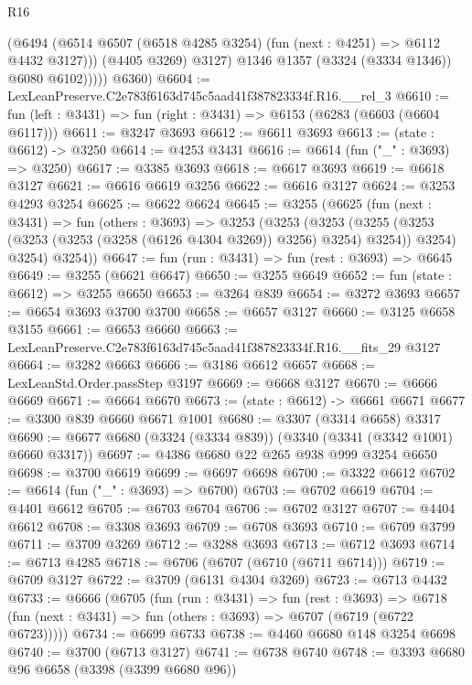 \begin{lexlean}{R16}
\begin{coremodule}
                  (@6494
                    (@6514 @6507 (@6518 @4285 @3254) (fun (next : @4251) => @6112 @4432 @3127)))
                  (@4405 @3269)
                  @3127)
                @1346
                @1357
                (@3324 (@3334 @1346))
                @6080
                @6102)))))
      @6360)
@6604 := LexLeanPreserve.C2e783f6163d745c5aad41f387823334f.R16.__rel_3
@6610 := fun (left : @3431) => fun (right : @3431) => @6153 (@6283 (@6603 (@6604 @6117)))
@6611 := @3247 @3693
@6612 := @6611 @3693
@6613 := (state : @6612) -> @3250
@6614 := @4253 @3431
@6616 := @6614 (fun ("_" : @3693) => @3250)
@6617 := @3385 @3693
@6618 := @6617 @3693
@6619 := @6618 @3127
@6621 := @6616 @6619 @3256
@6622 := @6616 @3127
@6624 := @3253 @4293 @3254
@6625 := @6622 @6624
@6645 := @3255
    (@6625
      (fun (next : @3431) =>
      fun (others : @3693) =>
      @3253
        (@3253
          (@3253
            (@3255 (@3253 (@3253 (@3253 (@3258 (@6126 @4304 @3269)) @3256) @3254) @3254))
            @3254)
          @3254)
        @3254))
@6647 := fun (run : @3431) => fun (rest : @3693) => @6645
@6649 := @3255 (@6621 @6647)
@6650 := @3255 @6649
@6652 := fun (state : @6612) => @3255 @6650
@6653 := @3264 @839
@6654 := @3272 @3693
@6657 := @6654 @3693 @3700 @3700
@6658 := @6657 @3127
@6660 := @3125 @6658 @3155
@6661 := @6653 @6660
@6663 := LexLeanPreserve.C2e783f6163d745c5aad41f387823334f.R16.__fits_29 @3127
@6664 := @3282 @6663
@6666 := @3186 @6612 @6657
@6668 := LexLeanStd.Order.passStep @3197
@6669 := @6668 @3127
@6670 := @6666 @6669
@6671 := @6664 @6670
@6673 := (state : @6612) -> @6661 @6671
@6677 := @3300 @839 @6660 @6671 @1001
@6680 := @3307 (@3314 @6658) @3317
@6690 := @6677 @6680 (@3324 (@3334 @839)) (@3340 (@3341 (@3342 @1001) @6660 @3317))
@6697 := @4386 @6680 @22 @265 @938 @999 @3254 @6650
@6698 := @3700 @6619
@6699 := @6697 @6698
@6700 := @3322 @6612
@6702 := @6614 (fun ("_" : @3693) => @6700)
@6703 := @6702 @6619
@6704 := @4401 @6612
@6705 := @6703 @6704
@6706 := @6702 @3127
@6707 := @4404 @6612
@6708 := @3308 @3693
@6709 := @6708 @3693
@6710 := @6709 @3799
@6711 := @3709 @3269
@6712 := @3288 @3693
@6713 := @6712 @3693
@6714 := @6713 @4285
@6718 := @6706 (@6707 (@6710 (@6711 @6714)))
@6719 := @6709 @3127
@6722 := @3709 (@6131 @4304 @3269)
@6723 := @6713 @4432
@6733 := @6666
    (@6705
      (fun (run : @3431) =>
      fun (rest : @3693) =>
      @6718 (fun (next : @3431) => fun (others : @3693) => @6707 (@6719 (@6722 @6723)))))
@6734 := @6699 @6733
@6738 := @4460 @6680 @148 @3254 @6698
@6740 := @3700 (@6713 @3127)
@6741 := @6738 @6740
@6748 := @3393 @6680 @96 @6658 (@3398 (@3399 @6680 @96))

\end{coremodule}
\end{lexlean}
